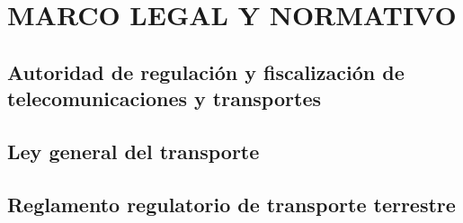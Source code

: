 	
		
		

	
	
	\section{MARCO LEGAL Y NORMATIVO}
	\subsection{Autoridad de regulación y fiscalización de telecomunicaciones y transportes}
	\subsection{Ley general del transporte}
	\subsection{Reglamento regulatorio de transporte terrestre}


